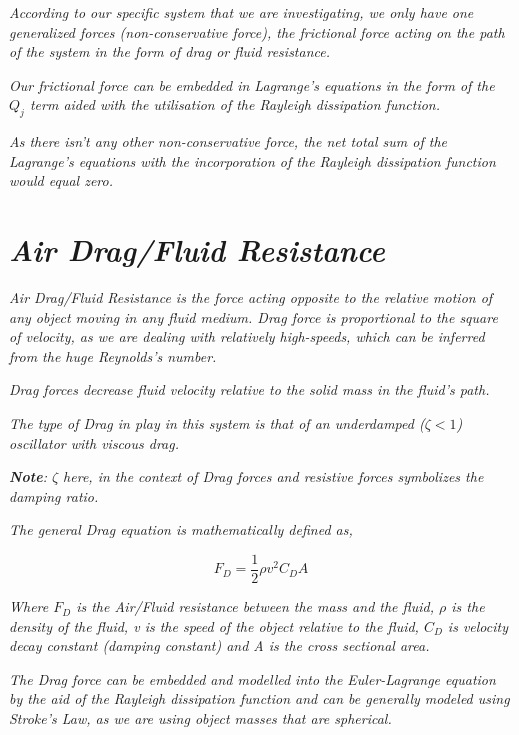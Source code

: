     \textit{According to our specific system that we are investigating, we only have one generalized forces (non-conservative force), the frictional force acting on the path of the system in the form of drag or fluid resistance.}
        
    \textit{Our frictional force can be embedded in Lagrange's equations in the form of the $Q_j$ term aided with the utilisation of the Rayleigh dissipation function.}
        
    \textit{As there isn't any other non-conservative force, the net total sum of the Lagrange's equations with the incorporation of the Rayleigh dissipation function would equal zero.}
        
\section{\textit{Air Drag/Fluid Resistance}}
        
    \textit{Air Drag/Fluid Resistance is the force acting opposite to the relative motion of any object moving in any fluid medium. Drag force is proportional to the square of velocity, as we are dealing with relatively high-speeds, which can be inferred from the huge Reynolds's number.}
            
    \textit{Drag forces decrease fluid velocity relative to the solid mass in the fluid's path.}
            
    \textit{The type of Drag in play in this system is that of an underdamped ($\zeta < 1$) oscillator with viscous drag.}
            
    \textit{\textbf{Note}: $\zeta$ here, in the context of Drag forces and resistive forces symbolizes the damping ratio.}
            
    \textit{The general Drag equation is mathematically defined as,}
            
        $$F_D = \frac{1}{2}\rho v^2C_DA$$
           
    \textit{Where $F_D$ is the Air/Fluid resistance between the mass and the fluid, $\rho$ is the density of the fluid, v is the speed of the object relative to the fluid, $C_D$ is velocity decay constant (damping constant) and A is the cross sectional area.}
            
    \textit{The Drag force can be embedded and modelled into the Euler-Lagrange equation by the aid of the Rayleigh dissipation function and can be generally modeled using Stroke's Law, as we are using object masses that are spherical.}
            
